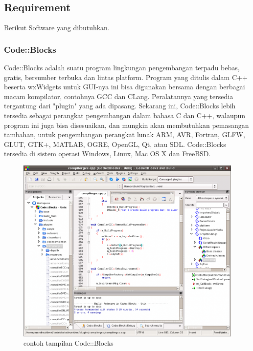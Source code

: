 \documentclass[12pt,]{article}
\begin{document}
	\subsection{Requirement}

	Berikut Software yang dibutuhkan.

	\subsubsection{Code::Blocks}
	Code::Blocks adalah suatu program lingkungan pengembangan terpadu bebas, gratis, bersumber terbuka dan lintas platform.
	Program yang ditulis dalam C++ beserta wxWidgets untuk GUI-nya ini bisa digunakan bersama dengan berbagai macam kompilator, contohnya GCC dan CLang.
	Peralatannya yang tersedia tergantung dari "plugin" yang ada dipasang.
	Sekarang ini, Code::Blocks lebih tersedia sebagai perangkat pengembangan dalam bahasa C dan C++, walaupun program ini juga bisa disesuaikan,
	dan mungkin akan membutuhkan pemasangan tambahan, untuk pengembangan perangkat lunak ARM, AVR, Fortran, GLFW, GLUT, GTK+,  MATLAB, OGRE, OpenGL, Qt, atau SDL.
	Code::Blocks tersedia di sistem operasi Windows, Linux, Mac OS X dan FreeBSD.
	\begin{figure}[H]
		\centering
		\includegraphics[width=0.6\linewidth]{images/cb}
		\caption{contoh tampilan Code::Blocks}
	\end{figure}
\end{document}
